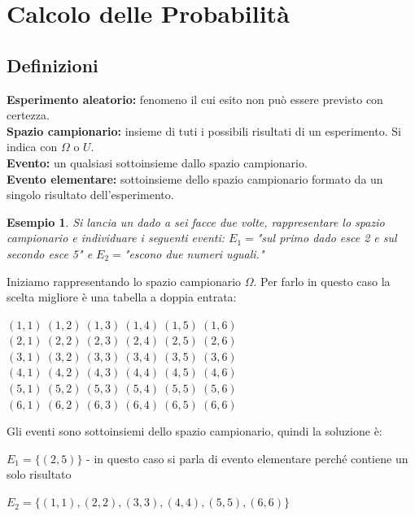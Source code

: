 \documentclass{article}     %
\newtheorem{ex}{Esempio}[section]
\begin{document}
    \section{Calcolo delle Probabilità}
        \subsection{Definizioni}
            \textbf{Esperimento aleatorio:} fenomeno il cui esito non può essere previsto con certezza.\\
            \textbf{Spazio campionario:} insieme di tuti i possibili risultati di un esperimento. Si indica con $\Omega$ o $U$.\\
            \textbf{Evento:} un qualsiasi sottoinsieme dallo spazio campionario.\\
            \textbf{Evento elementare:} sottoinsieme dello spazio campionario formato da un singolo risultato   dell'esperimento.
            \begin{ex}
                Si lancia un dado a sei facce due volte, rappresentare lo spazio campionario e individuare i seguenti eventi: $E_1=$"sul primo dado esce 2 e sul secondo esce 5" e $E_2=$"escono due numeri uguali."
                
            \end{ex}
            Iniziamo rappresentando lo spazio campionario $\Omega$. Per farlo in questo caso la scelta migliore è una tabella a doppia entrata:
            \begin{center}
                \((1,1)~(1,2)~(1,3)~(1,4)~(1,5)~(1,6)\)\\
                \((2,1)~(2,2)~(2,3)~(2,4)~(2,5)~(2,6)\)\\
                \((3,1)~(3,2)~(3,3)~(3,4)~(3,5)~(3,6)\)\\
                \((4,1)~(4,2)~(4,3)~(4,4)~(4,5)~(4,6)\)\\
                \((5,1)~(5,2)~(5,3)~(5,4)~(5,5)~(5,6)\)\\
                \((6,1)~(6,2)~(6,3)~(6,4)~(6,5)~(6,6)\)\\
            \end{center}

            Gli eventi sono sottoinsiemi dello spazio campionario, quindi la soluzione è:

            $E_1=\{(2,5)\}$ - in questo caso si parla di evento elementare perché contiene un solo risultato

            $E_2=\{(1,1), (2,2), (3,3), (4,4), (5,5), (6,6)\}$
\end{document}
